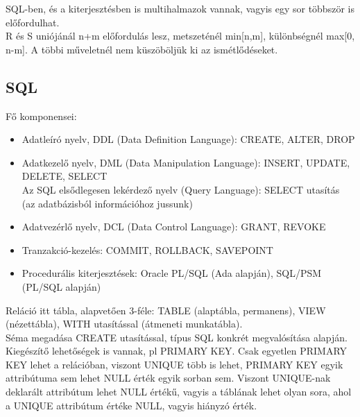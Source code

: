 \documentclass[margin=0px]{article}
\begin{document}
SQL-ben, és a kiterjesztésben is multihalmazok vannak, vagyis egy sor többször is előfordulhat. \\
R és S uniójánál n+m előfordulás lesz, metszeténél min[n,m], különbségnél max[0, n-m]. A többi műveletnél nem küszöböljük ki az ismétlődéseket.

\subsection{SQL}

Fő komponensei:
\begin{itemize}
    \item Adatleíró nyelv, DDL (Data Definition Language): CREATE, ALTER, DROP
    \item Adatkezelő nyelv, DML (Data Manipulation Language): INSERT, UPDATE, DELETE, SELECT \\
          Az SQL elsődlegesen lekérdező nyelv (Query Language): SELECT utasítás (az adatbázisból információhoz jussunk)
    \item Adatvezérlő nyelv, DCL (Data Control Language): GRANT, REVOKE
    \item Tranzakció-kezelés: COMMIT, ROLLBACK, SAVEPOINT
    \item Procedurális kiterjesztések: Oracle PL/SQL (Ada alapján), SQL/PSM (PL/SQL alapján)
\end{itemize}
Reláció itt tábla, alapvetően 3-féle: TABLE (alaptábla, permanens), VIEW (nézettábla), WITH utasítással (átmeneti munkatábla).\\
Séma megadása CREATE utasítással, típus SQL konkrét megvalósítása alapján. Kiegészítő lehetőségek is vannak, pl PRIMARY KEY. Csak egyetlen PRIMARY KEY lehet a relációban, viszont UNIQUE több is lehet, PRIMARY KEY egyik attribútuma sem lehet NULL érték egyik sorban sem. Viszont UNIQUE-nak deklarált attribútum lehet NULL értékű, vagyis a táblának lehet olyan sora, ahol a UNIQUE attribútum értéke NULL, vagyis hiányzó érték. \\ \\
\end{document}
